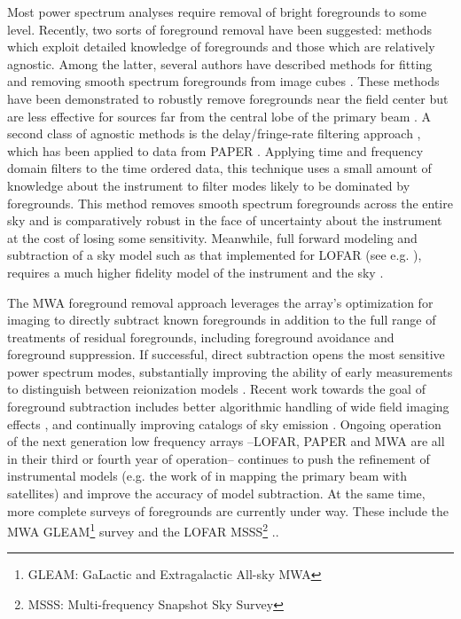 \documentclass[twolcolumn,iop]{emulateapj}
\begin{document}
Most power spectrum analyses require removal of bright foregrounds to some level.  Recently, two sorts of foreground removal have been suggested: methods which exploit detailed knowledge of foregrounds and those which are relatively agnostic. Among the latter, several authors have described methods for fitting and removing smooth spectrum foregrounds from image cubes  \cite{Morales:2006p1903,Bowman:2009p7816,Liu:2009p4762,Liu:2011p8763,Chapman:2013p10379,Dillon:2013p10497,Yatawatta:2013p9699}. These methods have been demonstrated to robustly remove foregrounds near the field center but are less effective for sources far from the central lobe of the primary beam \citep[][Pober et al, in press]{2015ApJ...804...14T,2015ApJ...807L..28T}.  A second class of agnostic methods is the delay/fringe-rate filtering approach \citep{Parsons:2012p8896,2014PhRvD..90b3018L,2014PhRvD..90b3019L}, which has been applied to data from PAPER \citep{Parsons:2014p10499,	2015ApJ...809...61A,2015ApJ...801...51J}.  Applying time and frequency domain filters to the time ordered data, this technique uses a small amount of knowledge about the instrument to filter modes likely to be dominated by foregrounds.  This method removes smooth spectrum foregrounds across the entire sky and is comparatively robust in the face of uncertainty about the instrument at the cost of losing some sensitivity.  Meanwhile, full forward modeling and subtraction of a sky model such as that implemented for LOFAR (see e.g. \cite{Jelic:2008p2130,Yatawatta:2013p9699}), requires a much higher fidelity model of the instrument and the sky \citep{Datta:2010p8781,Vedantham:2012p10297}.


The MWA foreground removal approach leverages the array's optimization for imaging to directly subtract known foregrounds in addition to the full range of treatments of residual foregrounds, including foreground avoidance and foreground suppression.  If successful, direct subtraction opens the most sensitive power spectrum modes, substantially improving the ability of early measurements to distinguish between reionization models \citep{Beardsley:2013p9952,Pober:2014p10390}. Recent work towards the goal of foreground subtraction includes better algorithmic handling of wide field imaging effects \citep{Tasse:2012p9459,Bhatnagar..2013ApJ,Sullivan:2012p9457,Ord:2010p8442,2014MNRAS.444..606O}, and continually improving catalogs of sky emission \citep{deOliveiraCosta:2008p2242,Jacobs:2011p8438,2013ApJ...776..108J,Hurley-walker:2014p45}. Ongoing operation of the next generation low frequency arrays --LOFAR, PAPER and MWA are all in their  third or fourth year of operation-- continues to push the refinement of instrumental models (e.g. the work of \cite{2015RaSc...50..614N} in mapping the primary beam with satellites) and improve the accuracy of model subtraction.  At the same time, more complete surveys of foregrounds are currently under way. These include the MWA GLEAM\footnote{GLEAM: GaLactic and Extragalactic All-sky MWA} survey \citep{2015PASA...32...25W}  and the LOFAR MSSS\footnote{MSSS: Multi-frequency Snapshot Sky Survey} \citep{2015A&A...582A.123H}..   
\end{document}
